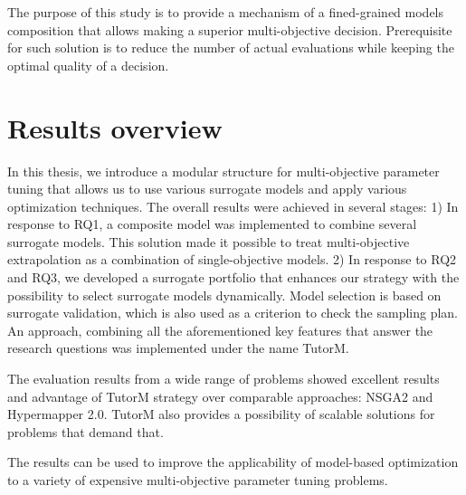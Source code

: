 The purpose of this study is to provide a mechanism of a fined-grained models composition that allows making a superior multi-objective decision. Prerequisite for such solution is to reduce the number of actual evaluations while keeping the optimal quality of a decision.

\section{Results overview}
    In this thesis, we introduce a modular structure for multi-objective parameter tuning that allows us to use various surrogate models and apply various optimization techniques. 
    The overall results were achieved in several stages: 1) In response to  RQ1, a composite model was implemented to combine several surrogate models. This solution made it possible to treat multi-objective extrapolation as a combination of single-objective models. 2) In response to RQ2 and RQ3, we developed a surrogate portfolio that enhances our strategy with the possibility to select surrogate models dynamically. Model selection is based on surrogate validation, which is also used as a criterion to check the sampling plan.
    An approach, combining all the aforementioned key features that answer the research questions was implemented under the name TutorM.

    The evaluation results from a wide range of problems showed excellent results and advantage of TutorM strategy over comparable approaches: NSGA2 and Hypermapper 2.0. TutorM also provides a possibility of scalable solutions for problems that demand that.

    The results can be used to improve the applicability of model-based optimization to a variety of expensive multi-objective parameter tuning problems.











